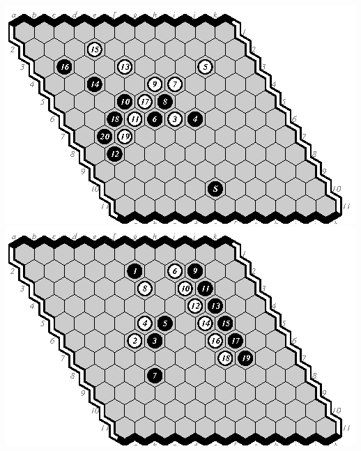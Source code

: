 \documentclass{icga}
\begin{document}
\includegraphics[scale=1.3]{7e-m.eps}\hspace*{-1cm}\includegraphics[scale=1.3]{8d-e.eps}
\end{document}
